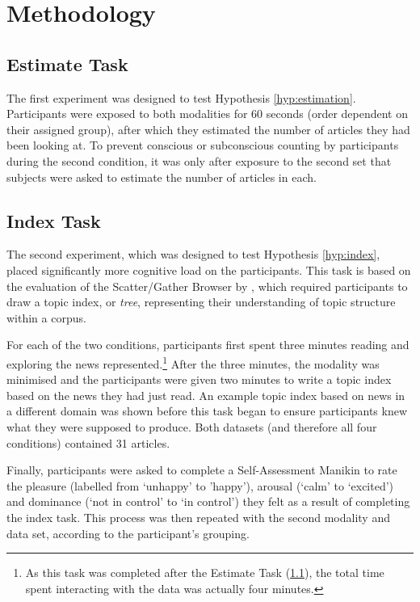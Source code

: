 \section{Methodology}

\subsection{Estimate Task} \label{task:est}

The first experiment was designed to test Hypothesis \ref{hyp:estimation}. Participants were exposed to both modalities for 60 seconds (order dependent on their assigned group), after which they estimated the number of articles they had been looking at. To prevent conscious or subconscious counting by participants during the second condition, it was only after exposure to the second set that subjects were asked to estimate the number of articles in each.

\subsection{Index Task}

The second experiment, which was designed to test Hypothesis \ref{hyp:index}, placed significantly more cognitive load on the participants. This task is based on the evaluation of the Scatter/Gather Browser by \cite{scattergather}, which required participants to draw a topic index, or \textit{tree}, representing their understanding of topic structure within a corpus.

For each of the two conditions, participants first spent three minutes reading and exploring the news represented.\footnote{As this task was completed after the Estimate Task (\ref{task:est}), the total time spent interacting with the data was actually four minutes.} After the three minutes, the modality was minimised and the participants were given two minutes to write a topic index based on the news they had just read. An example topic index based on news in a different domain was shown before this task began to ensure participants knew what they were supposed to produce. Both datasets (and therefore all four conditions) contained 31 articles.

Finally, participants were asked to complete a Self-Assessment Manikin \citep{measuringemotion} to rate the pleasure (labelled from `unhappy' to 'happy'), arousal (`calm' to `excited') and dominance (`not in control' to `in control') they felt as a result of completing the index task. This process was then repeated with the second modality and data set, according to the participant's grouping.

